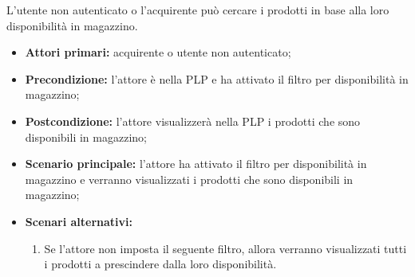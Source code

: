 \label{filtro-prodotti-acquirente.magazzino}

L'utente non autenticato o l'acquirente può cercare i prodotti in base alla loro disponibilità in magazzino.
\begin{itemize}
    \item \textbf{Attori primari:} acquirente o utente non autenticato;
    \item \textbf{Precondizione:} l'attore è nella PLP e ha attivato il filtro per disponibilità in magazzino;
    \item \textbf{Postcondizione:} l'attore visualizzerà nella PLP i prodotti che sono disponibili in magazzino;
    \item \textbf{Scenario principale:} l'attore ha attivato il filtro per disponibilità in magazzino e verranno visualizzati i prodotti che sono disponibili in magazzino;
    \item \textbf{Scenari alternativi:}
    \begin{enumerate}[label=\lett]
        \item Se l'attore non imposta il seguente filtro, allora verranno visualizzati tutti i prodotti a prescindere dalla loro disponibilità.
    \end{enumerate}
\end{itemize}

